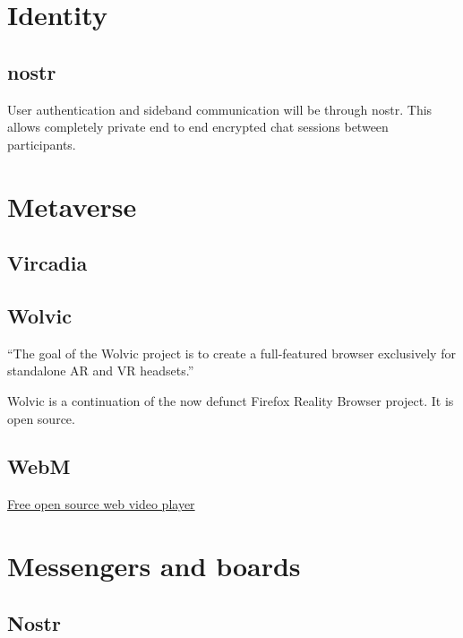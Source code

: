 



\section{Identity}
\subsection{nostr}
User authentication and sideband communication will be through nostr. This allows completely private end to end encrypted chat sessions between participants.
\section{Metaverse}
\subsection{Vircadia}
\subsection{Wolvic}
``The goal of the Wolvic project is to create a full-featured browser exclusively for standalone AR and VR headsets.''\par
Wolvic is a continuation of the now defunct Firefox Reality Browser project. It is open source.
\subsection{WebM}
\href{https://www.webmproject.org/about/}{Free open source web video player}	
\section{Messengers and boards}
\subsection{Nostr}
